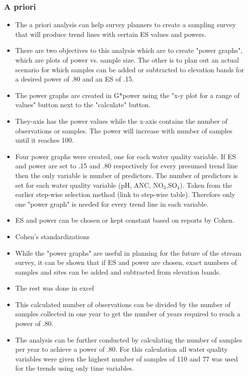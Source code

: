 \subsubsection{A priori}
\begin{itemize}
	\item The a priori analysis can help survey planners to create a sampling survey that will produce trend lines with certain ES values and powers.
	\item There are two objectives to this analysis which are to create "power graphs", which are plots of power vs. sample size.  The other is to plan out an actual scenario for which samples can be added or subtracted to elevation bands for a desired power of .80 and an ES of .15.
	\item The power graphs are created in G*power using the "x-y plot for a range of values" button next to the "calculate" button.
	\item They-axis has the power values while the x-axis contains the number of observations or samples.  The power will increase with number of samples until it reaches 100.
	\item Four power graphs were created, one for each water quality variable.  If ES and power are set to .15 and .80 respectively for every presumed trend line then the only variable is number of predictors.  The number of predictors is set for each water quality variable (pH, ANC, NO$_3$,SO$_4$).  Taken from the earlier step-wise selection method (link to step-wise table).  Therefore only one "power graph" is needed for every trend line in each variable.
	\item ES and power can be chosen or kept constant based on reports by Cohen.
	\item Cohen's standardizations
	\item While the "power graphs" are useful in planning for the future of the stream survey, it can be shown that if ES and power are chosen, exact numbers of samples and sites can be added and subtracted from elevation bands.
	\item The rest was done in excel
	\item This calculated number of observations can be divided by the number of samples collected in one year to get the number of years required to reach a power of .80.
	\item The analysis can be further conducted by calculating the number of samples per year to achieve a power of .80.  For this calculation all water quality variables were given the highest number of samples of 110 and 77 was used for the trends using only time variables.

\end{itemize}
